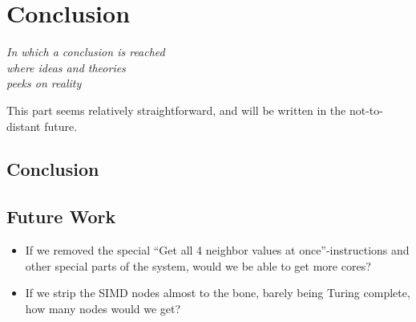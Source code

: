 \chapter{Conclusion}\label{ch:conc}

\begin{flushright}{\slshape
    In which a conclusion is reached\\
    where ideas and theories\\
    peeks on reality
}
\end{flushright}

This part seems relatively straightforward, and will be written in the
not-to-distant future.

\section{Conclusion}

\section{Future Work}

\begin{itemize}
\item If we removed the special ``Get all 4 neighbor values at
  once''-instructions and other special parts of the system, would we be able to
  get more cores?
\item If we strip the \ac{SIMD} nodes almost to the bone, barely being Turing
  complete, how many nodes would we get?
\end{itemize}
